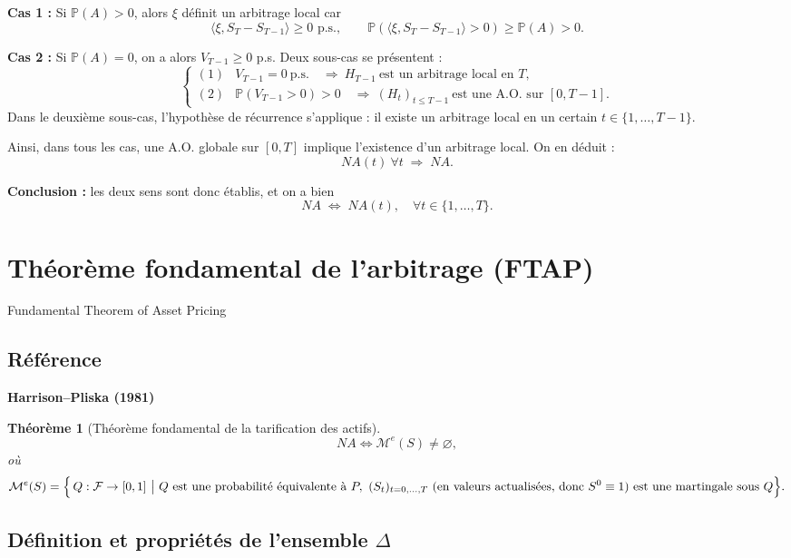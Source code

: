 \documentclass[12pt,a4paper]{article}
\makeatletter
\numberwithin{equation}{section}
\theoremstyle{plain} %
\newtheorem{theoreme}{Théorème}              %
\theoremstyle{definition} %
\theoremstyle{remark} %
\theoremstyle{myexample}
\theoremstyle{definition}
\renewenvironment{proof}[1][\proofname]{%
  \par\vspace{0.8em}%
  \pushQED{\qed}%
  \normalfont\color{cyan}%
  \topsep6\p@\@plus6\p@\relax
  \trivlist
  \item[\hskip\labelsep\bfseries\color{cyan}#1\@addpunct{.}]\ignorespaces
}{%
  \popQED\endtrivlist\vspace{0.8em}%
}
\makeatother
\begin{document}
\begin{proof}[Preuve du lemme : $NA \Longleftrightarrow NA(t)\ \forall t$]
\textbf{Cas 1 :} Si $\mathbb{P}(A) > 0$, alors $\xi$ définit un arbitrage local car
\[
\langle \xi, S_T - S_{T-1} \rangle \ge 0 \text{ p.s.}, 
\qquad 
\mathbb{P}(\langle \xi, S_T - S_{T-1} \rangle > 0) \ge \mathbb{P}(A) > 0.
\]

\textbf{Cas 2 :} Si $\mathbb{P}(A) = 0$, on a alors $V_{T-1} \ge 0$ p.s.  
Deux sous-cas se présentent :
\[
\begin{cases}
(1) & V_{T-1} = 0\ \text{p.s.} 
\quad \Rightarrow\ H_{T-1}\ \text{est un arbitrage local en } T, \\[0.5em]
(2) & \mathbb{P}(V_{T-1}>0) > 0 
\quad \Rightarrow\ (H_t)_{t\le T-1}\ \text{est une A.O. sur } [0,T-1].
\end{cases}
\]
Dans le deuxième sous-cas, l’hypothèse de récurrence s’applique : il existe un arbitrage local 
en un certain $t \in \{1,\ldots,T-1\}$.

Ainsi, dans tous les cas, une A.O. globale sur $[0,T]$ implique l’existence d’un arbitrage local.  
On en déduit :
\[
NA(t)\ \forall t \;\Rightarrow\; NA.
\]

\textbf{Conclusion :} les deux sens sont donc établis, et on a bien
\[
NA \;\Longleftrightarrow\; NA(t), \quad \forall t\in\{1,\ldots,T\}.
\]
\end{proof}

\clearpage
\section{Théorème fondamental de l’arbitrage (FTAP)}
Fundamental Theorem of Asset Pricing

\subsection{Référence}
\textbf{Harrison--Pliska (1981)}

\begin{theoreme}[Théorème fondamental de la tarification des actifs]
\[
NA \Longleftrightarrow \mathcal{M}^e(S) \neq \varnothing,
\]
où
\[
\mathcal{M}^e(S)
=\Bigl\{\, Q : \mathcal{F} \to [0,1] \ \big|\ Q \text{ est une probabilité équivalente à } P,\ 
(S_t)_{t=0,\dots,T} \text{ (en valeurs actualisées, donc } S^0 \equiv 1)
\text{ est une martingale sous } Q \Bigr\}.
\]
\end{theoreme}

\subsection{Définition et propriétés de l’ensemble $\Delta$}
\end{document}
